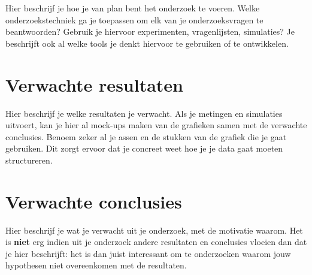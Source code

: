 Hier beschrijf je hoe je van plan bent het onderzoek te voeren. Welke onderzoekstechniek ga je toepassen om elk van je onderzoeksvragen te beantwoorden? Gebruik je hiervoor experimenten, vragenlijsten, simulaties? Je beschrijft ook al welke tools je denkt hiervoor te gebruiken of te ontwikkelen.

\section{Verwachte resultaten}
\label{sec:verwachte_resultaten}

Hier beschrijf je welke resultaten je verwacht. Als je metingen en simulaties uitvoert, kan je hier al mock-ups maken van de grafieken samen met de verwachte conclusies. Benoem zeker al je assen en de stukken van de grafiek die je gaat gebruiken. Dit zorgt ervoor dat je concreet weet hoe je je data gaat moeten structureren.

\section{Verwachte conclusies}
\label{sec:verwachte_conclusies}

Hier beschrijf je wat je verwacht uit je onderzoek, met de motivatie waarom. Het is \textbf{niet} erg indien uit je onderzoek andere resultaten en conclusies vloeien dan dat je hier beschrijft: het is dan juist interessant om te onderzoeken waarom jouw hypothesen niet overeenkomen met de resultaten.

